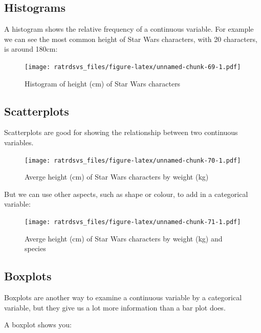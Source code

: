 \documentclass[
]{book}
\begin{document}
\hypertarget{vis_hist}{%
\subsection{Histograms}\label{vis_hist}}

A histogram shows the relative frequency of a continuous variable. For example we can see the most common height of Star Wars characters, with 20 characters, is around 180cm:

\begin{figure}
\centering
\texttt{[image: ratrdsvs\_files/figure-latex/unnamed-chunk-69-1.pdf]}
\caption{\label{fig:unnamed-chunk-69}Histogram of height (cm) of Star Wars characters}
\end{figure}

\hypertarget{vis_scatter}{%
\subsection{Scatterplots}\label{vis_scatter}}

Scatterplots are good for showing the relationship between two continuous variables.

\begin{figure}
\centering
\texttt{[image: ratrdsvs\_files/figure-latex/unnamed-chunk-70-1.pdf]}
\caption{\label{fig:unnamed-chunk-70}Averge height (cm) of Star Wars characters by weight (kg)}
\end{figure}

But we can use other aspects, such as shape or colour, to add in a categorical variable:

\begin{figure}
\centering
\texttt{[image: ratrdsvs\_files/figure-latex/unnamed-chunk-71-1.pdf]}
\caption{\label{fig:unnamed-chunk-71}Averge height (cm) of Star Wars characters by weight (kg) and species}
\end{figure}

\hypertarget{vis_box}{%
\subsection{Boxplots}\label{vis_box}}

Boxplots are another way to examine a continuous variable by a categorical variable, but they give us a lot more information than a bar plot does.

A boxplot shows you:
\end{document}
